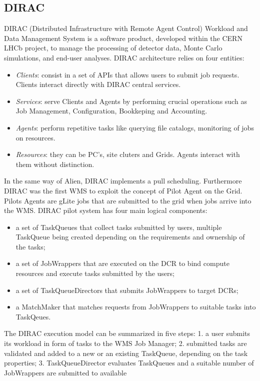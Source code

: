 \subsection{DIRAC} 
DIRAC (Distributed Infrastructure with Remote Agent Control) Workload and Data Management System is a software product, developed within the CERN LHCb project, to manage the processing of detector data, Monte Carlo simulations, and end-user analyses. 
DIRAC  architecture relies on four entities:
\begin{itemize}
\item \emph{Clients}: consist in a set of APIs that allows users to submit job requests. Clients interact directly with DIRAC central services.
\item \emph{Services}: serve Clients and Agents by performing crucial operations such as Job Management, Configuration, Bookkeping and Accounting.
\item \emph{Agents}: perform repetitive tasks like querying file catalogs,  monitoring of jobs on resources.
\item \emph{Resources}: they can be PC's, site cluters and Grids. Agents interact with them without distinction.
\end{itemize}
In the same way of Alien, DIRAC implements a pull scheduling. Furthermore DIRAC was the first WMS to exploit the concept of Pilot Agent on the Grid. 
Pilots Agents are gLite jobs that are submitted to the grid when jobs arrive into the WMS. 
DIRAC pilot system has four main logical components:
\begin{itemize}
\item a set of TaskQueues that collect tasks submitted by users, multiple TaskQueue being created depending on the requirements and ownership of the tasks;
\item a set of JobWrappers that are executed on the DCR to bind compute resources and execute tasks submitted by the users;
\item a set of TaskQueueDirectors that submits JobWrappers to target DCRs;
\item a MatchMaker that matches requests from JobWrappers to suitable tasks into TaskQeues.
\end{itemize}
The DIRAC execution model can be summarized in five
steps: 1. a user submits its workload in form of tasks to the WMS Job Manager; 2. submitted tasks are validated and added to a new or an existing TaskQueue, depending on the task properties; 3. TaskQueueDirector evaluates TaskQueues and a suitable number of JobWrappers are submitted to available

